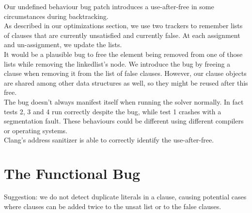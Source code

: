 \documentclass[a4paper]{article}
\begin{document}
Our undefined behaviour bug patch introduces a use-after-free in some circumstances during backtracking.\\

As described in our optimizations section, we use two trackers to remember lists of clauses that are currently unsatisfied and currently false. At each assignment and un-assignment, we update the lists.\\

It would be a plausible bug to free the element being removed from one of those lists while removing the linkedlist's node. We introduce the bug by freeing a clause when removing it from the list of false clauses. However, our clause objects are shared among other data structures as well, so they might be reused after this free.\\

The bug doesn't always manifest itself when running the solver normally. In fact tests 2, 3 and 4 run correctly despite the bug, while test 1 crashes with a segmentation fault. These behaviours could be different using different compilers or operating systems.\\

Clang's address sanitizer is able to correctly identify the use-after-free.\\

\section{The Functional Bug}

Suggestion: we do not detect duplicate literals in a clause, causing potential cases where clauses can be added twice to the unsat list or to the false clauses.\\
\end{document}
